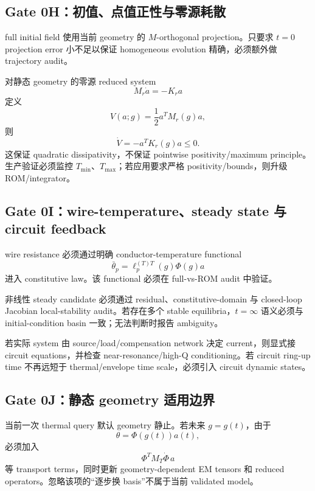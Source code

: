 \subsection{Gate 0H：初值、点值正性与零源耗散}
full initial field 使用当前 geometry 的 $M$-orthogonal projection。只要求 $t=0$ projection error 小不足以保证 homogeneous evolution 精确，必须额外做 trajectory audit。

对静态 geometry 的零源 reduced system
\begin{equation}
M_r\dot a=-K_ra
\end{equation}
定义
\begin{equation}
V(a;g)=\frac12a^TM_r(g)a,
\end{equation}
则
\begin{equation}
\dot V=-a^TK_r(g)a\le0.
\end{equation}
这保证 quadratic dissipativity，不保证 pointwise positivity/maximum principle。生产验证必须监控 $T_{\min}$、$T_{\max}$；若应用要求严格 positivity/bounds，则升级 ROM/integrator。

\subsection{Gate 0I：wire-temperature、steady state 与 circuit feedback}
wire resistance 必须通过明确 conductor-temperature functional
\begin{equation}
\bar\theta_p=\ell_p^{(T)T}(g)\Phi(g)a
\end{equation}
进入 constitutive law。该 functional 必须在 full-vs-ROM audit 中验证。

非线性 steady candidate 必须通过 residual、constitutive-domain 与 closed-loop Jacobian local-stability audit。若存在多个 stable equilibria，$t=\infty$ 语义必须与 initial-condition basin 一致；无法判断时报告 ambiguity。

若实际 system 由 source/load/compensation network 决定 current，则显式接 circuit equations，并检查 near-resonance/high-Q conditioning。若 circuit ring-up time 不再远短于 thermal/envelope time scale，必须引入 circuit dynamic states。

\subsection{Gate 0J：静态 geometry 适用边界}
当前一次 thermal query 默认 geometry 静止。若未来 $g=g(t)$，由于
\begin{equation}
\theta=\Phi(g(t))a(t),
\end{equation}
必须加入
\begin{equation}
\Phi^TM_T\dot\Phi\,a
\end{equation}
等 transport terms，同时更新 geometry-dependent EM tensors 和 reduced operators。忽略该项的“逐步换 basis”不属于当前 validated model。

